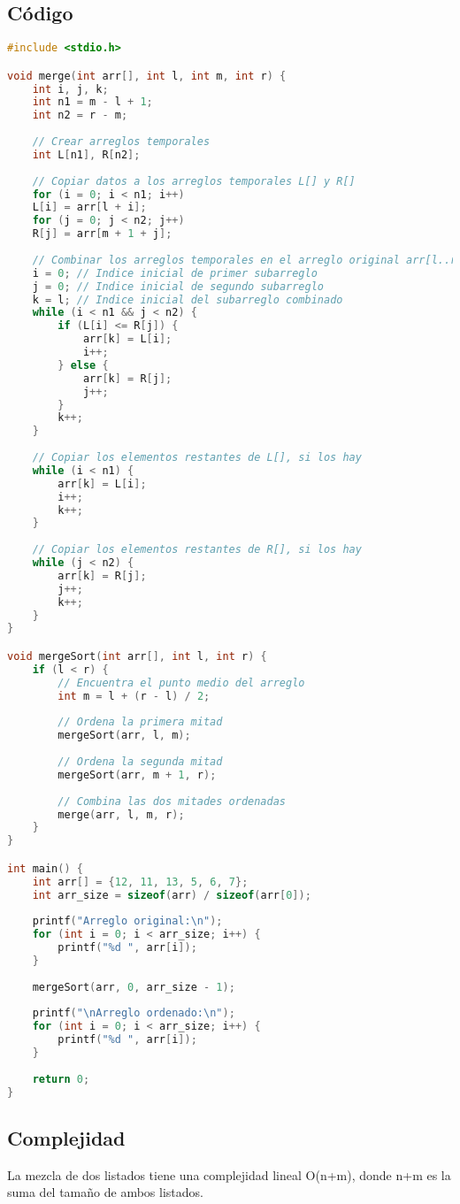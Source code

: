 \documentclass[]{article}
\begin{document}
\subsection{Código}
\begin{lstlisting}[language=C]
#include <stdio.h>

void merge(int arr[], int l, int m, int r) {
	int i, j, k;
	int n1 = m - l + 1;
	int n2 = r - m;
	
	// Crear arreglos temporales
	int L[n1], R[n2];
	
	// Copiar datos a los arreglos temporales L[] y R[]
	for (i = 0; i < n1; i++)
	L[i] = arr[l + i];
	for (j = 0; j < n2; j++)
	R[j] = arr[m + 1 + j];
	
	// Combinar los arreglos temporales en el arreglo original arr[l..r]
	i = 0; // Indice inicial de primer subarreglo
	j = 0; // Indice inicial de segundo subarreglo
	k = l; // Indice inicial del subarreglo combinado
	while (i < n1 && j < n2) {
		if (L[i] <= R[j]) {
			arr[k] = L[i];
			i++;
		} else {
			arr[k] = R[j];
			j++;
		}
		k++;
	}
	
	// Copiar los elementos restantes de L[], si los hay
	while (i < n1) {
		arr[k] = L[i];
		i++;
		k++;
	}
	
	// Copiar los elementos restantes de R[], si los hay
	while (j < n2) {
		arr[k] = R[j];
		j++;
		k++;
	}
}

void mergeSort(int arr[], int l, int r) {
	if (l < r) {
		// Encuentra el punto medio del arreglo
		int m = l + (r - l) / 2;
		
		// Ordena la primera mitad
		mergeSort(arr, l, m);
		
		// Ordena la segunda mitad
		mergeSort(arr, m + 1, r);
		
		// Combina las dos mitades ordenadas
		merge(arr, l, m, r);
	}
}

int main() {
	int arr[] = {12, 11, 13, 5, 6, 7};
	int arr_size = sizeof(arr) / sizeof(arr[0]);
	
	printf("Arreglo original:\n");
	for (int i = 0; i < arr_size; i++) {
		printf("%d ", arr[i]);
	}
	
	mergeSort(arr, 0, arr_size - 1);
	
	printf("\nArreglo ordenado:\n");
	for (int i = 0; i < arr_size; i++) {
		printf("%d ", arr[i]);
	}
	
	return 0;
}

\end{lstlisting}
\subsection{Complejidad}
La mezcla de dos listados tiene una complejidad lineal O(n+m), donde n+m es la suma del tamaño de ambos listados.\\
\end{document}
